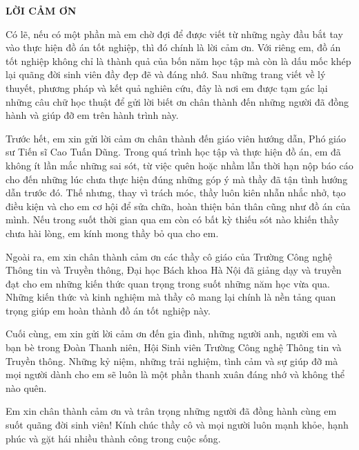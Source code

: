 \documentclass[../DoAn.tex]{subfiles}
\begin{document}
\begin{center}
    {\bfseries\fontsize{18pt}{22pt}\selectfont LỜI CẢM ƠN}
\end{center}
\vspace{1.5cm}

Có lẽ, nếu có một phần mà em chờ đợi để được viết từ những ngày đầu bắt tay vào thực hiện đồ án tốt nghiệp, thì đó chính là lời cảm ơn. Với riêng em, đồ án tốt nghiệp không chỉ là thành quả của bốn năm học tập mà còn là dấu mốc khép lại quãng đời sinh viên đầy đẹp đẽ và đáng nhớ. Sau những trang viết về lý thuyết, phương pháp và kết quả nghiên cứu, đây là nơi em được tạm gác lại những câu chữ học thuật để gửi lời biết ơn chân thành đến những người đã đồng hành và giúp đỡ em trên hành trình này.

Trước hết, em xin gửi lời cảm ơn chân thành đến giáo viên hướng dẫn, Phó giáo sư Tiến sĩ Cao Tuấn Dũng. Trong quá trình học tập và thực hiện đồ án, em đã không ít lần mắc những sai sót, từ việc quên hoặc nhầm lẫn thời hạn nộp báo cáo cho đến những lúc chưa thực hiện đúng những góp ý mà thầy đã tận tình hướng dẫn trước đó. Thế nhưng, thay vì trách móc, thầy luôn kiên nhẫn nhắc nhở, tạo điều kiện và cho em cơ hội để sửa chữa, hoàn thiện bản thân cũng như đồ án của mình. Nếu trong suốt thời gian qua em còn có bất kỳ thiếu sót nào khiến thầy chưa hài lòng, em kính mong thầy bỏ qua cho em.

Ngoài ra, em xin chân thành cảm ơn các thầy cô giáo của Trường Công nghệ Thông tin và Truyền thông, Đại học Bách khoa Hà Nội đã giảng dạy và truyền đạt cho em những kiến thức quan trọng trong suốt những năm học vừa qua. Những kiến thức và kinh nghiệm mà thầy cô mang lại chính là nền tảng quan trọng giúp em hoàn thành đồ án tốt nghiệp này.

Cuối cùng, em xin gửi lời cảm ơn đến gia đình, những người anh, người em và bạn bè trong Đoàn Thanh niên, Hội Sinh viên Trường Công nghệ Thông tin và Truyền thông. Những kỷ niệm, những trải nghiệm, tình cảm và sự giúp đỡ mà mọi người dành cho em sẽ luôn là một phần thanh xuân đáng nhớ và không thể nào quên.

Em xin chân thành cảm ơn và trân trọng những người đã đồng hành cùng em suốt quãng đời sinh viên! Kính chúc thầy cô và mọi người luôn mạnh khỏe, hạnh phúc và gặt hái nhiều thành công trong cuộc sống.
\end{document}
